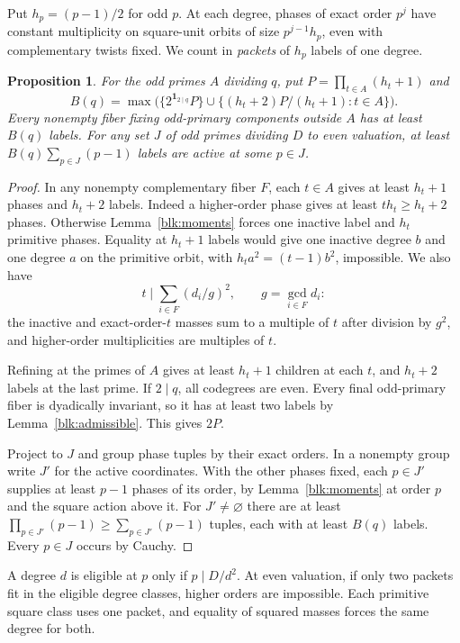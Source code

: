 \documentclass[11pt]{amsart}
\numberwithin{equation}{section}
\newtheorem{proposition}[theorem]{Proposition}
\begin{document}
Put $h_p=(p-1)/2$ for odd $p$. At each degree, phases of exact order
$p^j$ have constant multiplicity on square-unit orbits of size
$p^{j-1}h_p$, even with complementary twists fixed. We count in
\emph{packets} of $h_p$ labels of one degree.

\begin{proposition}\label{blk:packets}
For the odd primes $A$ dividing $q$, put $P=\prod_{t\in A}(h_t+1)$ and
\[
 B(q)=\max\bigl(\{2^{\mathbf1_{2\mid q}}P\}\cup
 \{(h_t+2)P/(h_t+1):t\in A\}\bigr).
\]
Every nonempty fiber fixing odd-primary components outside $A$ has at
least $B(q)$ labels. For any set $J$ of odd primes dividing $D$ to even
valuation, at least $B(q)\sum_{p\in J}(p-1)$ labels are active at some $p\in J$.
\end{proposition}
\begin{proof}
In any nonempty complementary fiber $F$, each $t\in A$ gives at least
$h_t+1$ phases and $h_t+2$ labels. Indeed a higher-order phase gives at
least $th_t\ge h_t+2$ phases. Otherwise Lemma~\ref{blk:moments} forces one
inactive label and $h_t$ primitive phases. Equality at $h_t+1$ labels
would give one inactive degree $b$ and one degree $a$ on the primitive orbit,
with $h_ta^2=(t-1)b^2$, impossible. We also have
\begin{equation}\label{blk:fibergcd}
 t\mid\sum_{i\in F}(d_i/g)^2,\qquad g=\gcd_{i\in F}d_i :
\end{equation}
the inactive and exact-order-$t$ masses sum to a multiple of $t$ after
division by $g^2$, and higher-order multiplicities are multiples of $t$.

Refining at the primes of $A$ gives at least $h_t+1$ children at each
$t$, and $h_t+2$ labels at the last prime. If $2\mid q$, all codegrees
are even. Every final odd-primary fiber is dyadically invariant, so it has
at least two labels by Lemma~\ref{blk:admissible}. This gives $2P$.

Project to $J$ and group phase tuples by their exact orders. In a
nonempty group write $J'$ for the active coordinates. With the other
phases fixed, each $p\in J'$ supplies at least $p-1$ phases of its
order, by Lemma~\ref{blk:moments} at order $p$ and the square action
above it. For $J'\ne\varnothing$ there are at least
$\prod_{p\in J'}(p-1)\ge\sum_{p\in J'}(p-1)$ tuples, each with at least
$B(q)$ labels. Every $p\in J$ occurs by Cauchy.
\end{proof}

A degree $d$ is eligible at $p$ only if $p\mid D/d^2$. At even valuation,
if only two packets fit in the eligible degree classes, higher orders are
impossible. Each primitive square class uses one packet, and equality
of squared masses forces the same degree for both.
\end{document}
